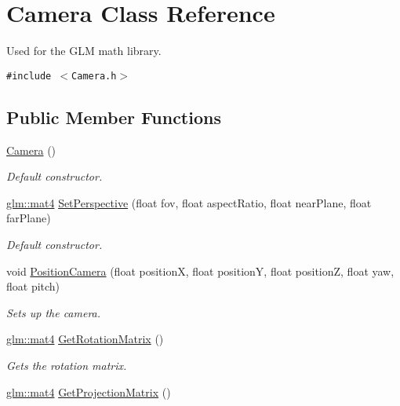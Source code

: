 \hypertarget{class_camera}{
\section{Camera Class Reference}
\label{class_camera}
}
Used for the GLM math library.  


{\tt \#include $<$Camera.h$>$}

\subsection*{Public Member Functions}
\begin{CompactItemize}
\item 
\hyperlink{class_camera_01f94c3543f56ede7af49dc778f19331}{Camera} ()
\begin{CompactList}\small\item\em Default constructor. \item\end{CompactList}\item 
\hyperlink{group__core__types_g7dcd2365c2e368e6af5b7adeb6a9c8df}{glm::mat4} \hyperlink{class_camera_621b0ca0ddcab43fb95ee754c443dfa4}{SetPerspective} (float fov, float aspectRatio, float nearPlane, float farPlane)
\begin{CompactList}\small\item\em Default constructor. \item\end{CompactList}\item 
void \hyperlink{class_camera_e32a72f519739a0b4dce07433cfbe9ef}{PositionCamera} (float positionX, float positionY, float positionZ, float yaw, float pitch)
\begin{CompactList}\small\item\em Sets up the camera. \item\end{CompactList}\item 
\hyperlink{group__core__types_g7dcd2365c2e368e6af5b7adeb6a9c8df}{glm::mat4} \hyperlink{class_camera_3518233b244af839db6eefe59e7002de}{GetRotationMatrix} ()
\begin{CompactList}\small\item\em Gets the rotation matrix. \item\end{CompactList}\item 
\hyperlink{group__core__types_g7dcd2365c2e368e6af5b7adeb6a9c8df}{glm::mat4} \hyperlink{class_camera_b0a4bf5a65d45f25529e3cffda1c361b}{GetProjectionMatrix} ()

\end{CompactItemize}
